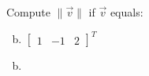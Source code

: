 \documentclass[../main.tex]{subfiles}
\begin{document}
Compute $\|\vec{v}\|$ if $\vec{v}$ equals:
\begin{enumerate}[a)]
	\setcounter{enumi}{1}
	\item $\begin{bmatrix}1&-1&2\end{bmatrix}^T$
\end{enumerate}

\solution
\begin{enumerate}[a)]
	\setcounter{enumi}{1}
	\item 
\end{enumerate}
\end{document}
